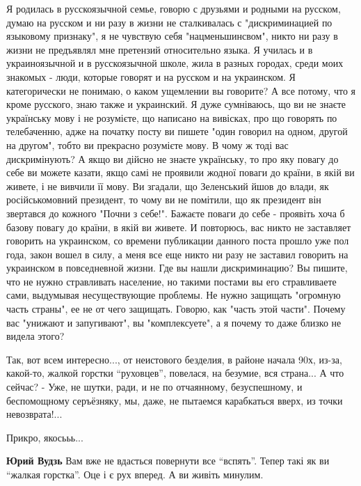 \begin{itemize}
Я родилась в русскоязычной семье, говорю с друзьями и родными на русском, думаю
на русском и ни разу в жизни не сталкивалась с "дискриминацией по языковому
признаку", я не чувствую себя "нацменьшинсвом", никто ни разу в жизни не
предъявлял мне претензий относительно языка. Я училась и в украиноязычной и в
русскоязычной школе, жила в разных городах, среди моих знакомых - люди, которые
говорят и на русском и на украинском. Я категорически не понимаю, о каком
ущемлении вы говорите? А все потому, что я кроме русского, знаю также и
украинский. Я дуже сумніваюсь, що ви не знаєте українську мову і не розумієте,
що написано на вивісках, про що говорять по телебаченню, адже на початку посту
ви пишете "один говорил на одном, другой на другом", тобто ви прекрасно
розумієте мову. В чому ж тоді вас дискримінують? А якщо ви дійсно не знаєте
українську, то про яку повагу до себе ви можете казати, якщо самі не проявили
жодної поваги до країни, в якій ви живете, і не вивчили її мову. Ви згадали, що
Зеленський йшов до влади, як російськомовний президент, то чому ви не помітили,
що як президент він звертався до кожного "Почни з себе!". Бажаєте поваги до
себе - проявіть хоча б базову повагу до країни, в якій ви живете. И повторюсь,
вас никто не заставляет говорить на украинском, со времени публикации данного
поста прошло уже пол года, закон вошел в силу, а меня все еще никто ни разу не
заставил говорить на украинском в повседневной жизни. Где вы нашли
дискриминацию? Вы пишите, что не нужно стравливать население, но такими постами
вы его стравливаете сами, выдумывая несуществующие проблемы. Не нужно защищать
"огромную часть страны", ее не от чего защищать. Говорю, как "часть этой
части". Почему вас "унижают и запугивают", вы "комплексуете", а я почему то
даже близко не видела этого?


Так, вот всем интересно..., от неистового безделия, в районе начала 90х, из-за,
какой-то, жалкой горстки \enquote{руховцев}, повелася, на безумие, вся страна...
А что сейчас?
- Уже, не шутки, ради, и не по отчаянному, безуспешному, и беспомощному серъёзняку, мы, даже, не пытаемся карабкаться вверх, из точки невозврата!...

\begin{itemize}
Прикро, якосььь...

\textbf{Юрий Вудзь} Вам вже не вдасться повернути все \enquote{вспять}. Тепер
такі як ви \enquote{жалкая горстка}. Оце і є рух вперед. А ви живіть минулим.


\end{itemize}
\end{itemize}
